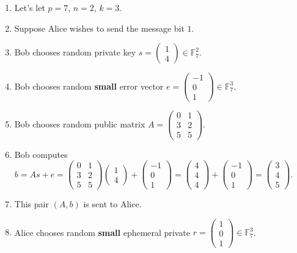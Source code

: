 \documentclass{article}
\theoremstyle{plain}
\theoremstyle{definition}
\theoremstyle{remark}
\numberwithin{theorem}{section}
\newcommand{\FF}{\mathbb{F}}
\begin{document}
\begin{enumerate}
    \item Let's let $p=7$, $n=2$, $k=3$.
    \item Suppose Alice wishes to send the message bit $1$.
    \item Bob chooses random private key $s = \begin{pmatrix}1\\4\end{pmatrix} \in \FF_7^2$.
    \item Bob chooses random \textbf{small} error vector $e = \begin{pmatrix} -1 \\ 0 \\ 1 \end{pmatrix} \in \FF_7^3$.
    \item Bob chooses random public matrix $A = \begin{pmatrix} 0 & 1 \\ 3 & 2 \\ 5 & 5 \end{pmatrix}$.
    \item Bob computes $b = As + e = \begin{pmatrix} 0 & 1 \\ 3 & 2 \\ 5 & 5 \end{pmatrix}\begin{pmatrix}1\\4\end{pmatrix} +\begin{pmatrix} -1 \\ 0 \\ 1 \end{pmatrix} = 
    \begin{pmatrix} 4 \\ 4 \\ 4 \end{pmatrix}+
    \begin{pmatrix} -1 \\ 0 \\ 1 \end{pmatrix}=
    \begin{pmatrix} 3 \\ 4 \\ 5 \end{pmatrix}$.
    \item This pair $(A,b)$ is sent to Alice.
    \item Alice chooses random \textbf{small} ephemeral private $r = \begin{pmatrix} 1 \\ 0 \\ 1 \end{pmatrix} \in \FF_7^3$.

\end{enumerate}
\end{document}
